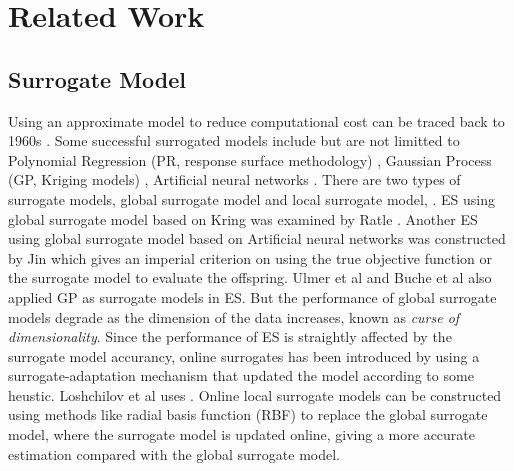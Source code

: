 




\section{Related Work}

\subsection{Surrogate Model} 

Using an approximate model to reduce computational cost can be traced back to 1960s \cite{dunham1963design}. Some successful surrogated models include but are not limitted to Polynomial Regression (PR, response surface methodology) \cite{doi:10.1080/00401706.1966.10490404}, Gaussian Process (GP, Kriging models) \cite{sacks1989}, Artificial neural networks \cite{Smith:1993:NNS:583180}. There are two types of surrogate models, global surrogate model and local surrogate model, . ES using global surrogate model based on Kring was examined by Ratle \cite{Ratle:2001:KSF:966173.966177}. Another ES using global surrogate model based on Artificial neural networks was constructed by Jin \cite{Jin02aframework} which gives an imperial criterion on using the true objective function or the surrogate model to evaluate the offspring. Ulmer et al \cite{Ulmer03evolutionstrategies} and Buche et al \cite{1424193} also applied GP as surrogate models in ES. But the performance of global surrogate models degrade as the dimension of the data increases, known as \textit{curse of dimensionality}. Since the performance of ES is straightly affected by the surrogate model accurancy, online surrogates has been introduced by using a surrogate-adaptation mechanism that updated the model according to some heustic. Loshchilov et al \cite{loshchilov2012self} uses .
Online local surrogate models \cite{4033013} can be constructed using methods like radial basis function (RBF) \cite{GIANNAKOGLOU200243} to replace the global surrogate model, where the surrogate model is updated online, giving a more accurate estimation compared with the global surrogate model.





